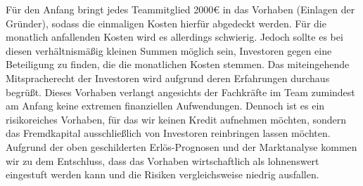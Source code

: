 Für den Anfang bringt jedes Teammitglied 2000{\euro} in das Vorhaben (Einlagen der Gründer), sodass die einmaligen Kosten hierfür abgedeckt werden. Für die monatlich anfallenden Kosten wird es allerdings schwierig. Jedoch sollte es bei diesen verhältnismäßig kleinen Summen möglich sein, Investoren gegen eine Beteiligung zu finden, die die monatlichen Kosten stemmen. Das miteingehende Mitspracherecht der Investoren wird aufgrund deren Erfahrungen durchaus begrüßt. Dieses Vorhaben verlangt angesichts der Fachkräfte im Team zumindest am Anfang keine extremen finanziellen Aufwendungen. Dennoch ist es ein risikoreiches Vorhaben, für das wir keinen Kredit aufnehmen möchten, sondern das Fremdkapital ausschließlich von Investoren reinbringen lassen möchten. Aufgrund der oben geschilderten Erlös-Prognosen und der Marktanalyse kommen wir zu dem Entschluss, dass das Vorhaben wirtschaftlich als lohnenswert eingestuft werden kann und die Risiken vergleichsweise niedrig ausfallen.
